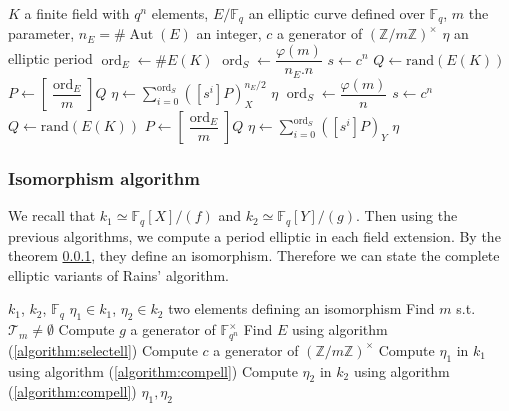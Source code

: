 \documentclass[12pt]{article}
\theoremstyle{plain}
\theoremstyle{definition}
\DeclareMathOperator{\order}{ord} %
\DeclareMathOperator{\Aut}{Aut}
\def\Z{\ensuremath{\mathbb{Z}}}
\def\F{\ensuremath{\mathbb{F}}}
\newcounter{algorithm}
\begin{document}
\begin{algorithm}
\label{algorithm:compell}
    \begin{algorithmic}[1]
    \REQUIRE $K$ a finite field with $q^n$ elements, $E/\F_q$ an elliptic curve
defined over $\F_q$, $m$ the parameter, $n_E = \#\Aut(E)$ an integer, $c$ a 
generator of $(\Z/m\Z)^{\times}$
    \ENSURE $\eta$ an elliptic period
    \STATE $\order_E\leftarrow\#E(K)$
        \STATE $\order_S \leftarrow \dfrac{\varphi(m)}{n_E.n}$
        \STATE $s \leftarrow c^n$
        \REPEAT
            \STATE $Q\leftarrow\text{rand}(E(K))$
            \STATE $P\leftarrow[\dfrac{\order_E}{m}]Q$
        \STATE $\eta\leftarrow\sum_{i=0}^{\order_S}{\left([s^i]P\right)_X^{n_E/2}}$
        \RETURN $\eta$
    \ELSE
        \STATE $\order_S \leftarrow \dfrac{\varphi(m)}{n}$
        \STATE $s \leftarrow c^n$
        \REPEAT
            \STATE $Q\leftarrow\text{rand}(E(K))$
            \STATE $P\leftarrow[\dfrac{\order_E}{m}]Q$
        \STATE $\eta\leftarrow\sum_{i=0}^{\order_S}{\left([s^i]P\right)_Y}$
        \RETURN $\eta$
    \ENDIF
    \end{algorithmic}
\end{algorithm}

\subsubsection{Isomorphism algorithm}

We recall that $k_1\simeq\F_q[X]/(f)$ and $k_2\simeq\F_q[Y]/(g)$. Then using the
previous algorithms, we compute a period elliptic in each field extension. By
the theorem \ref{}, they define an isomorphism. Therefore we can state the
complete elliptic variants of Rains' algorithm.

\begin{algorithm}
\label{algorithm:rainsell}
    \begin{algorithmic}[1]
    \REQUIRE $k_1$, $k_2$, $\F_q$
    \ENSURE $\eta_1\in k_1$, $\eta_2\in k_2$ two elements defining an
isomorphism
    \STATE Find $m$ s.t. $\mathcal{T}_m\neq\emptyset$
    \STATE Compute $g$ a generator of $\F_{q^n}^{\times}$
    \STATE Find $E$ using algorithm (\ref{algorithm:selectell})
    \STATE Compute $c$ a generator of $(\Z/m\Z)^{\times}$
    \STATE Compute $\eta_1$ in $k_1$ using algorithm (\ref{algorithm:compell})
    \STATE Compute $\eta_2$ in $k_2$ using algorithm (\ref{algorithm:compell})
    \RETURN $\eta_1, \eta_2$
    \end{algorithmic}
\end{algorithm}
\end{document}
